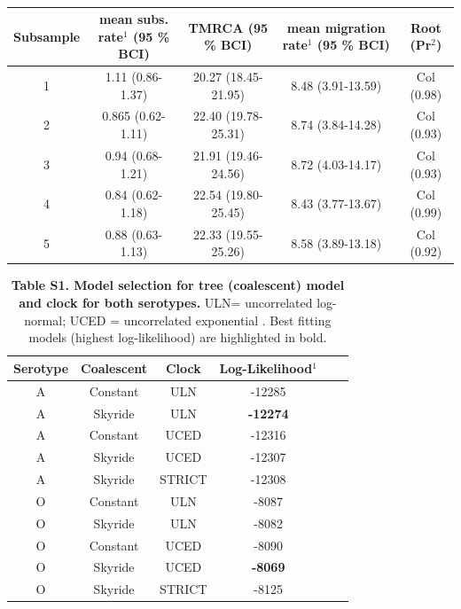 \documentclass[a4paper,10pt]{article}
\begin{document}
\newpage
\begin{table}
\medskip
\begin{minipage}{\textwidth} 
\begin{center}
\caption{}
\begin{tabular}{ccccc}
\toprule
Subsample	&mean subs. rate$^{1}$ (95 \% BCI)	&TMRCA (95 \% BCI)	&mean migration rate$^{1}$ (95 \% BCI)	&Root (Pr$^{2}$)\\
\midrule
1	&1.11 (0.86-1.37)	&20.27 (18.45-21.95)	&8.48 (3.91-13.59)	&Col (0.98)\\
2	&0.865 (0.62-1.11)	&22.40 (19.78-25.31)	&8.74 (3.84-14.28)	&Col (0.93)\\
3	&0.94 (0.68-1.21)	&21.91 (19.46-24.56)	&8.72 (4.03-14.17)	&Col (0.93)\\
4	&0.84 (0.62-1.18)	&22.54 (19.80-25.45)	&8.43 (3.77-13.67)	&Col (0.99)\\
5	&0.88 (0.63-1.13)	&22.33 (19.55-25.26)	&8.58 (3.89-13.18)	&Col (0.92)\\

\bottomrule
\end{tabular}
\label{tab:ED_O}
\end{center}
\end{minipage}
\end{table}
\begin{table}[!ht]
\caption*{\textbf{Table S1. Model selection for tree (coalescent) model and clock for both serotypes.}  ULN= uncorrelated log-normal; UCED = uncorrelated exponential . Best fitting models (highest log-likelihood) are highlighted in bold.}
\begin{tabular}{cccccc}
\toprule
Serotype	&Coalescent	&Clock	&Log-Likelihood$^{1}$\\
\midrule
A	&Constant	&ULN	&-12285\\
A	&Skyride 	&ULN	&\textbf{-12274}\\
A	&Constant	&UCED	&-12316\\
A	&Skyride 	&UCED	&-12307\\
A       &Skyride       &STRICT &-12308\\
O	&Constant	&ULN	&-8087\\
O	&Skyride 	&ULN	&-8082\\
O	&Constant	&UCED	&-8090\\
O	&Skyride 	&UCED	&\textbf{-8069}\\
O       &Skyride       &STRICT &-8125\\
\bottomrule
\end{tabular}
\begin{flushleft}
\end{flushleft}
\label{stab:treeclockselection}
 \end{table}
\end{document}
